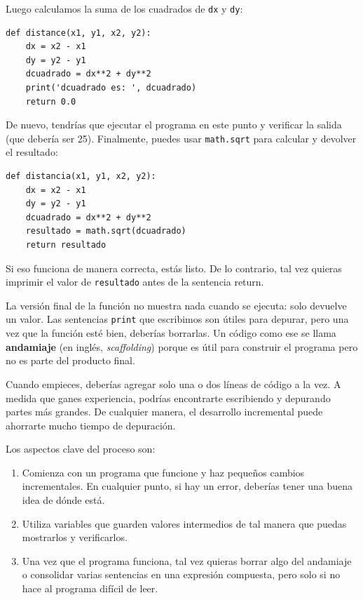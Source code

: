 \documentclass[10pt]{book}
\begin{document}
Luego calculamos la suma de los cuadrados de {\tt dx} y {\tt dy}:

\begin{verbatim}
def distance(x1, y1, x2, y2):
    dx = x2 - x1
    dy = y2 - y1
    dcuadrado = dx**2 + dy**2
    print('dcuadrado es: ', dcuadrado)
    return 0.0
\end{verbatim}
%
De nuevo, tendrías que ejecutar el programa en este punto y verificar la salida
(que debería ser 25).
Finalmente, puedes usar {\tt math.sqrt} para calcular y devolver el resultado:

\begin{verbatim}
def distancia(x1, y1, x2, y2):
    dx = x2 - x1
    dy = y2 - y1
    dcuadrado = dx**2 + dy**2
    resultado = math.sqrt(dcuadrado)
    return resultado
\end{verbatim}
%
Si eso funciona de manera correcta, estás listo.  De lo contrario, tal vez
quieras imprimir el valor de {\tt resultado} antes de la sentencia
return.

La versión final de la función no muestra nada cuando se
ejecuta: solo devuelve un valor.  Las sentencias {\tt print} que escribimos
son útiles para depurar, pero una vez que la función esté bien, deberías
borrarlas.  Un código como ese se llama {\bf andamiaje} (en inglés, {\em scaffolding})
porque es útil para construir el programa pero no es parte del
producto final.

Cuando empieces, deberías agregar solo una o dos líneas de código a la
vez.  A medida que ganes experiencia, podrías encontrarte escribiendo
y depurando partes más grandes.  De cualquier manera, el desarrollo incremental
puede ahorrarte mucho tiempo de depuración.

Los aspectos clave del proceso son:

\begin{enumerate}

\item Comienza con un programa que funcione y haz pequeños cambios incrementales.
En cualquier punto, si hay un error, deberías tener una buena idea de
dónde está.

\item Utiliza variables que guarden valores intermedios de tal manera que puedas
mostrarlos y verificarlos.

\item Una vez que el programa funciona, tal vez quieras borrar algo del
andamiaje o consolidar varias sentencias en una expresión
compuesta, pero solo si no hace al programa difícil de
leer.

\end{enumerate}
\end{document}
